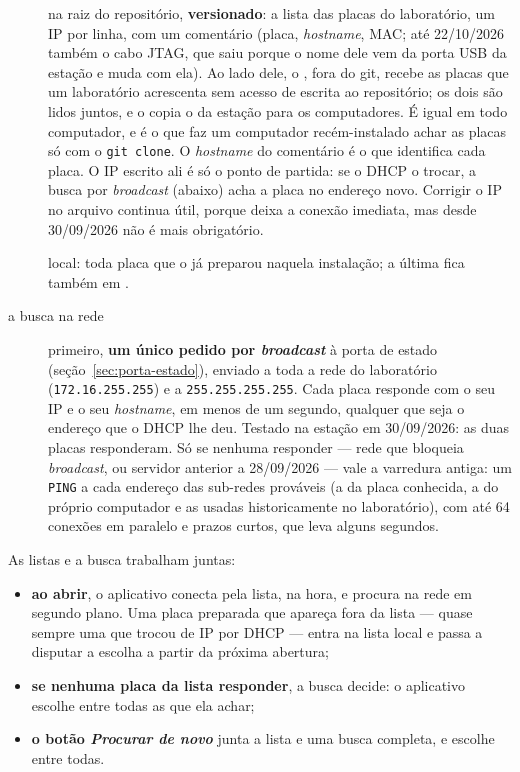 \begin{description}
  \item[] na raiz do repositório, \textbf{versionado}: a lista
    das placas do laboratório, um IP por linha, com um comentário (placa,
    \emph{hostname}, MAC; até 22/10/2026 também o cabo JTAG, que saiu porque
    o nome dele vem da porta USB da estação e muda com ela). Ao lado dele, o
    , fora do git, recebe as placas que um laboratório
    acrescenta sem acesso de escrita ao repositório; os dois são lidos juntos,
    e o  copia o da estação para os computadores. É igual em todo computador, e é o que
    faz um computador recém-instalado achar as placas só com o
    \texttt{git clone}. O \emph{hostname} do comentário é o que identifica
    cada placa. O IP escrito ali é só o ponto de partida: se o DHCP o trocar,
    a busca por \emph{broadcast} (abaixo) acha a placa no endereço novo.
    Corrigir o IP no arquivo continua útil, porque deixa a conexão imediata,
    mas desde 30/09/2026 não é mais obrigatório.
  \item[] local: toda placa que o
     já preparou naquela instalação; a última fica também
    em .
  \item[a busca na rede] primeiro, \textbf{um único pedido por
    \emph{broadcast}} à porta de estado (seção~\ref{sec:porta-estado}),
    enviado a toda a rede do laboratório (\texttt{172.16.255.255}) e a
    \texttt{255.255.255.255}. Cada placa responde com o seu IP e o seu
    \emph{hostname}, em menos de um segundo, qualquer que seja o endereço que
    o DHCP lhe deu. Testado na estação em 30/09/2026: as duas placas
    responderam. Só se nenhuma responder --- rede que bloqueia
    \emph{broadcast}, ou servidor anterior a 28/09/2026 --- vale a varredura
    antiga: um \texttt{PING} a cada endereço das sub-redes prováveis (a da
    placa conhecida, a do próprio computador e as usadas historicamente no
    laboratório), com até 64 conexões em paralelo e prazos curtos, que leva
    alguns segundos.
\end{description}

As listas e a busca trabalham juntas:

\begin{itemize}
  \item \textbf{ao abrir}, o aplicativo conecta pela lista, na hora, e procura
    na rede em segundo plano. Uma placa preparada que apareça fora da lista ---
    quase sempre uma que trocou de IP por DHCP --- entra na lista local e passa
    a disputar a escolha a partir da próxima abertura;
  \item \textbf{se nenhuma placa da lista responder}, a busca decide: o
    aplicativo escolhe entre todas as que ela achar;
  \item \textbf{o botão \emph{Procurar de novo}} junta a lista e uma busca
    completa, e escolhe entre todas.
\end{itemize}

